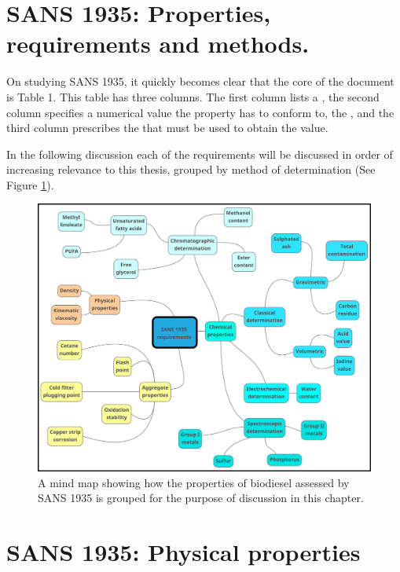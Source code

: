 \section{SANS 1935: Properties, requirements and methods.}

On studying SANS 1935, it quickly becomes clear that the core of the document
is Table 1. This table has three columns. The first column lists a
, the second column specifies a numerical value the property
has to conform to, the , and the third column prescribes
the  that must be used to obtain the value.

In the following discussion each of the requirements will be discussed in order
of increasing relevance to this thesis, grouped by method of determination (See
Figure \ref{fig:MindMap}).


\begin{figure}
\centering
\includegraphics[width=\textwidth]{Figures/SANS1935MindMap.pdf}
\decoRule

\caption[Discussion of SANS 1935]{A mind map showing how the properties of
biodiesel assessed by SANS 1935 is grouped for the purpose of discussion in this
chapter.}

\label{fig:MindMap}
\end{figure}

\section{SANS 1935: Physical properties}

